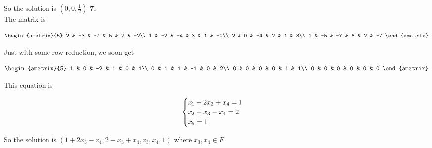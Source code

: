 \documentclass[11pt]{article}
\begin{document}
So the solution is $(0, 0, \frac{1}{2})$
\newpage
\textbf{7.}\\

The matrix is

\[
  \begin{amatrix}{5}
    2 & -3 & -7 & 5 & 2 & -2\\
    1 & -2 & -4 & 3 & 1 & -2\\
    2 & 0 & -4 & 2 & 1 & 3\\
    1 & -5 & -7 & 6 & 2 & -7
  \end{amatrix}
\]

Just with some row reduction, we soon get

\[
  \begin{amatrix}{5}
    1 & 0 & -2 & 1 & 0 & 1\\
    0 & 1 & 1 & -1 & 0 & 2\\
    0 & 0 & 0 & 0 & 1 & 1\\
    0 & 0 & 0 & 0 & 0 & 0 
  \end{amatrix}
\]

This equation is 

\begin{equation}
  \begin{cases}
    x_1 - 2x_3 + x_4 = 1\\
    x_2 + x_3 - x_4 = 2\\
    x_5 = 1
  \end{cases}\\
\end{equation}

So the solution is $(1 + 2x_3 - x_4, 2 - x_3 + x_4, x_3, x_4, 1)$ where $x_3, x_4 \in F$
\end{document}
